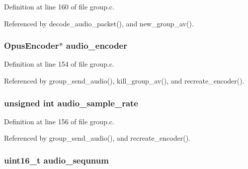 Definition at line 160 of file group.\+c.



Referenced by decode\+\_\+audio\+\_\+packet(), and new\+\_\+group\+\_\+av().

\hypertarget{struct_group___a_v_a8c1fa3d73f3426ba5cac83857c390ebc}{
\subsubsection[{audio\+\_\+encoder}]{\setlength{\rightskip}{0pt plus 5cm}Opus\+Encoder$\ast$ audio\+\_\+encoder}}\label{struct_group___a_v_a8c1fa3d73f3426ba5cac83857c390ebc}


Definition at line 154 of file group.\+c.



Referenced by group\+\_\+send\+\_\+audio(), kill\+\_\+group\+\_\+av(), and recreate\+\_\+encoder().

\hypertarget{struct_group___a_v_a0562d75f5e3bb5cce19ab1eae44fdaac}{
\subsubsection[{audio\+\_\+sample\+\_\+rate}]{\setlength{\rightskip}{0pt plus 5cm}unsigned int audio\+\_\+sample\+\_\+rate}}\label{struct_group___a_v_a0562d75f5e3bb5cce19ab1eae44fdaac}


Definition at line 156 of file group.\+c.



Referenced by group\+\_\+send\+\_\+audio(), and recreate\+\_\+encoder().

\hypertarget{struct_group___a_v_a4e6b863a96b5fadfc86cc2ef353c76db}{
\subsubsection[{audio\+\_\+sequnum}]{\setlength{\rightskip}{0pt plus 5cm}uint16\+\_\+t audio\+\_\+sequnum}}\label{struct_group___a_v_a4e6b863a96b5fadfc86cc2ef353c76db}


